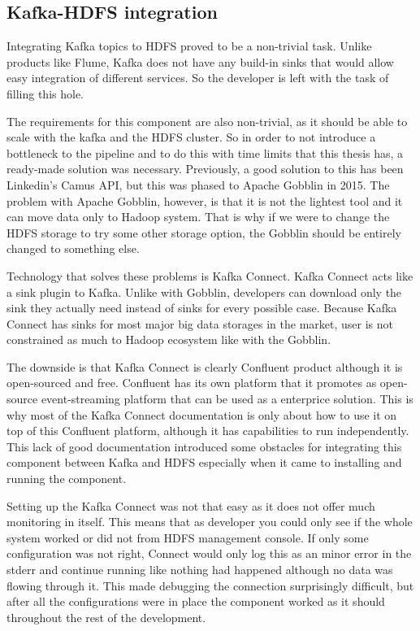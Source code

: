 \subsection{Kafka-HDFS integration}

Integrating Kafka topics to HDFS proved to be a non-trivial task.
Unlike products like Flume, Kafka does not have any build-in sinks that would allow easy integration of different services.
So the developer is left with the task of filling this hole.

The requirements for this component are also non-trivial, as it should be able to scale with the kafka and the HDFS cluster.
So in order to not introduce a bottleneck to the pipeline and to do this with time limits that this thesis has, a ready-made solution was necessary.
Previously, a good solution to this has been Linkedin's Camus API, but this was phased to Apache Gobblin in 2015. 
The problem with Apache Gobblin, however, is that it is not the lightest tool and it can move data only to Hadoop system.
That is why if we were to change the HDFS storage to try some other storage option, the Gobblin should be entirely changed to something else.

Technology that solves these problems is Kafka Connect. 
Kafka Connect acts like a sink plugin to Kafka.
Unlike with Gobblin, developers can download only the sink they actually need instead of sinks for every possible case.
Because Kafka Connect has sinks for most major big data storages in the market, user is not constrained as much to Hadoop ecosystem like with the Gobblin.

The downside is that Kafka Connect is clearly Confluent product although it is open-sourced and free.
Confluent has its own platform that it promotes as open-source event-streaming platform that can be used as a enterprice solution. 
This is why most of the Kafka Connect documentation is only about how to use it on top of this Confluent platform, although it has capabilities to run independently.
This lack of good documentation introduced some obstacles for integrating this component between Kafka and HDFS especially when it came to installing and running the component.

Setting up the Kafka Connect was not that easy as it does not offer much monitoring in itself.
This means that as developer you could only see if the whole system worked or did not from HDFS management console.
If only some configuration was not right, Connect would only log this as an minor error in the stderr and continue running like nothing had happened although no data was flowing through it.
This made debugging the connection surprisingly difficult, but after all the configurations were in place the component worked as it should throughout the rest of the development.

